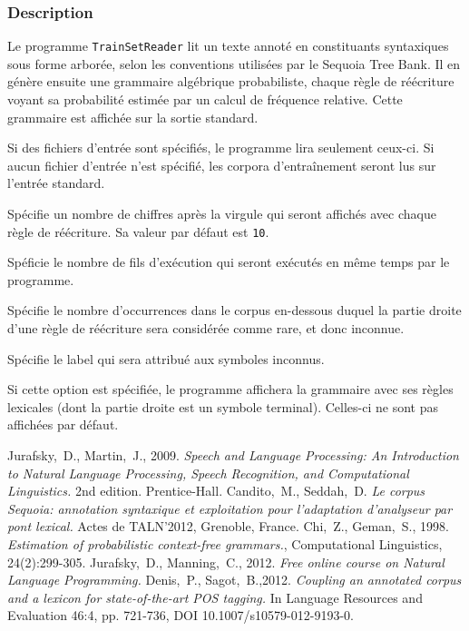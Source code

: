 \documentclass[12pt]{article}
\begin{document}
\subsubsection{Description}
 
Le programme \texttt{TrainSetReader} lit un texte annoté en constituants
syntaxiques sous forme arborée, selon les conventions utilisées par le Sequoia Tree Bank. Il en
génère ensuite une grammaire algébrique probabiliste, chaque règle de réécriture
voyant sa probabilité estimée par un calcul de fréquence relative. Cette
grammaire est affichée sur la sortie standard.
 
Si des fichiers d'entrée sont spécifiés, le programme lira seulement ceux-ci. Si
aucun fichier d'entrée n'est spécifié, les corpora d'entraînement seront lus sur
l'entrée standard.

\begin{description}[style=nextline]
\item[\texttt{-p, --precision precision}] Spécifie un nombre de chiffres après
la virgule qui seront affichés avec chaque règle de réécriture. Sa valeur par défaut est
\texttt{10}.
\item[\texttt{-t, --nthreads threads}] Spéficie le nombre de fils d'exécution
qui seront exécutés en même temps par le programme.
\item[\texttt{-u, --unknown-threshold unknown\_threshold}] Spécifie le nombre
d'occurrences dans le corpus en-dessous duquel la partie droite d'une règle de
réécriture sera considérée comme rare, et donc inconnue.
\item[\texttt{-s, --unknown-label unknown\_label}] Spécifie le label qui sera
attribué aux symboles inconnus.
\item[\texttt{-l, --lexical}] Si cette option est spécifiée, le programme
affichera la grammaire avec ses règles lexicales (dont la partie droite est un
symbole terminal). Celles-ci ne sont pas affichées par défaut.
\end{description}


\begin{thebibliography}{9}
    Jurafsky,~D., Martin,~J., 2009. \emph{Speech and Language Processing: An Introduction to Natural Language Processing, Speech Recognition, and Computational Linguistics.} 2nd edition. Prentice-Hall.
    Candito,~M., Seddah,~D.
    \emph{Le corpus Sequoia: annotation syntaxique et exploitation pour
    l'adaptation d'analyseur par pont lexical.} Actes de TALN'2012, Grenoble,
    France.
    Chi,~Z., Geman,~S., 1998.
    \emph{Estimation of probabilistic context-free grammars.}, Computational Linguistics, 24(2):299-305.
    Jurafsky,~D., Manning,~C., 2012. \emph{Free online course on Natural
    Language Programming.}
    Denis,~P., Sagot,~B.,2012.
    \emph{Coupling an annotated corpus and a lexicon for state-of-the-art POS
    tagging.} In Language Resources and Evaluation 46:4, pp. 721-736,
    DOI 10.1007/s10579-012-9193-0.
    
\end{thebibliography}
\end{document}
